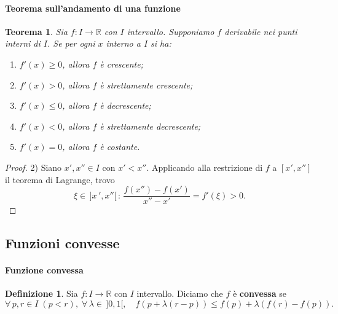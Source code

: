 \documentclass{article}
\theoremstyle{plain}
\newtheorem{thm}{Teorema}[section]
\theoremstyle{definition}
\newtheorem{defn}{Definizione}[section]
\theoremstyle{remark}
\begin{document}
\vspace{10pt}

\paragraph{Teorema sull'andamento di una funzione}
\begin{bxthm}
\begin{thm}
    Sia $f:I\to\mathbb{R}$ con $I$ intervallo. Supponiamo $f$ derivabile nei punti interni di $I$. 
    Se per ogni $x$ interno a $I$ si ha:
    \begin{enumerate}
        \item $f'(x)\geq0$, allora $f$ è crescente;
        \item $f'(x)>0$, allora $f$ è strettamente crescente;
        \item $f'(x)\leq0$, allora $f$ è decrescente;
        \item $f'(x)<0$, allora $f$ è strettamente decrescente;
        \item $f'(x)=0$, allora $f$ è costante.
    \end{enumerate}
\end{thm}
\end{bxthm}
\begin{proof}
    2) Siano $x',x''\in I$ con $x'<x''$. 
    Applicando alla restrizione di $f$ a $[x',x'']$ il teorema di Lagrange, 
    trovo 
    \[\xi\in\,]x\,',x''[\,:\,\dfrac{f(x'')-f(x')}{x''-x'}=f'(\xi)>0.\]
\end{proof}

\vspace{10pt}

\subsection{Funzioni convesse}

\vspace{10pt}

\paragraph{Funzione convessa}
\begin{bxthm}
\begin{defn}
    Sia $f:I\to\mathbb{R}$ con $I$ intervallo. Diciamo che $f$ è \textbf{convessa} se 
    \[\forall\, p,r\in I\;(p<r),\;\forall\, \lambda\in\,]0,1[,\quad f(p+\lambda(r-p))\leq f(p)+\lambda(f(r)-f(p)).\]
\end{defn}
\end{bxthm}
\end{document}
